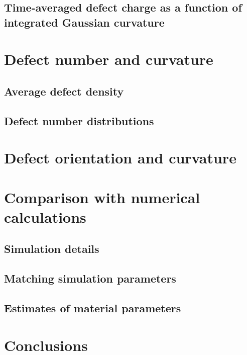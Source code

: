 \subsection{Time-averaged defect charge as a function of integrated Gaussian curvature}

\section{Defect number and curvature}
\subsection{Average defect density}
\subsection{Defect number distributions}

\section{Defect orientation and curvature}

\section{Comparison with numerical calculations}
\subsection{Simulation details}
\subsection{Matching simulation parameters}
\subsection{Estimates of material parameters}

\section{Conclusions}
